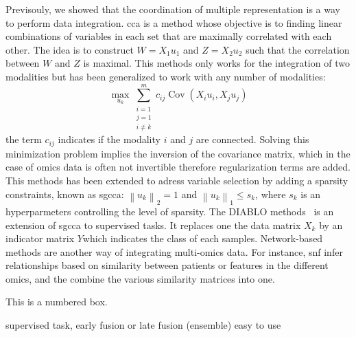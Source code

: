 \documentclass[../main.tex]{subfiles}
\begin{document}
		Previsouly, we showed that the coordination of multiple representation is a way to perform data integration.
		\Gls{cca} is a method whose objective is to finding linear combinations of variables in each set that are maximally correlated with each other.
		The idea is to construct \(W=X_1u_1\) and \(Z=X_2u_2\) such that the correlation between \(W\) and \(Z\) is maximal.
		This methods only works for the integration of two modalities but has been generalized to work with any number of modalities:
		\begin{equation}
			\max_{u_k} \sum_{\substack{i=1 \\ j=1 \\ i\neq k}}^{m} c_{ij}\operatorname{Cov}\left(X_iu_i,X_ju_j\right)
		\end{equation}
		the term \(c_{ij}\) indicates if the modality \(i\) and \(j\) are connected.
		Solving this minimization problem implies the inversion of the covariance matrix, which in the case of omics data is often not invertible therefore regularization terms are added.
		This methods has been extended to adress variable selection by adding a sparsity constraints, known as \gls{sgcca}: \({\left\|u_k \right\|}_2 = 1\) and \({\left\|u_k \right\|}_1 \leq s_k\), where \(s_k\) is an hyperparmeters controlling the level of sparsity.
		The DIABLO methods~\cite{DIABLO} is an extension of \gls{sgcca} to supervised tasks.
		It replaces one the data matrix \(X_k\) by an indicator matrix \(Y\)which indicates the class of each samples.
		Network-based methods are another way of integrating multi-omics data.
		For instance, \gls{snf} infer relationships based on similarity between patients or features in the different omics, and the combine the various similarity matrices into one.

		\begin{mybox}[label=box:snf]{}
			This is a numbered box.
		\end{mybox}

		supervised task, early fusion or late fusion (ensemble) easy to use

\end{document}
